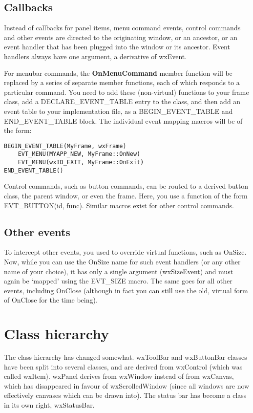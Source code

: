 \subsection{Callbacks}

Instead of callbacks for panel items, menu command events, control commands and other events are directed to
the originating window, or an ancestor, or an event handler that has been plugged into the window
or its ancestor. Event handlers always have one argument, a derivative of wxEvent.

For menubar commands, the {\bf OnMenuCommand} member function will be replaced by a series of separate member functions,
each of which responds to a particular command. You need to add these (non-virtual) functions to your
frame class, add a DECLARE\_EVENT\_TABLE entry to the class, and then add an event table to
your implementation file, as a BEGIN\_EVENT\_TABLE and END\_EVENT\_TABLE block. The
individual event mapping macros will be of the form:

\begin{verbatim}
BEGIN_EVENT_TABLE(MyFrame, wxFrame)
    EVT_MENU(MYAPP_NEW, MyFrame::OnNew)
    EVT_MENU(wxID_EXIT, MyFrame::OnExit)
END_EVENT_TABLE()
\end{verbatim}

Control commands, such as button commands, can be routed to a derived button class,
the parent window, or even the frame. Here, you use a function of the form EVT\_BUTTON(id, func).
Similar macros exist for other control commands.

\subsection{Other events}

To intercept other events, you used to override virtual functions, such as OnSize. Now, while you can use
the OnSize name for such event handlers (or any other name of your choice), it has only a single argument
(wxSizeEvent) and must again be `mapped' using the EVT\_SIZE macro. The same goes for all other events,
including OnClose (although in fact you can still use the old, virtual form of OnClose for the time being).

\section{Class hierarchy}\label{portingclasshierarchy}

The class hierarchy has changed somewhat. wxToolBar and wxButtonBar
classes have been split into several classes, and are derived from wxControl (which was
called wxItem). wxPanel derives from wxWindow instead of from wxCanvas, which has
disappeared in favour of wxScrolledWindow (since all windows are now effectively canvases
which can be drawn into). The status bar has become a class in its own right, wxStatusBar.

